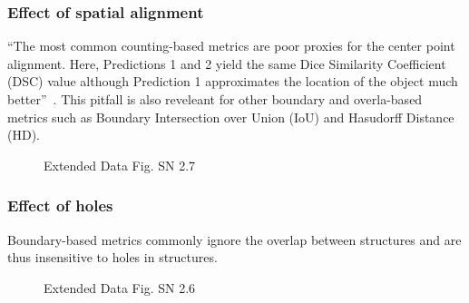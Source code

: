 \documentclass[11pt]{article}
\begin{document}
\subsubsection{Effect of spatial alignment}

``The most common counting-based metrics are poor proxies for the center point alignment. Here, Predictions 1 and 2 yield the same Dice Similarity Coefficient (DSC) value although Prediction 1 approximates the location of the object much better''~\cite{pitfalls-in-segmentation-evaluation}. This pitfall is also reveleant for other boundary and overla-based metrics such as Boundary Intersection over Union (IoU) and Hasudorff Distance (HD).

\begin{figure}[H]
    \centering
    \caption{Extended Data Fig. SN 2.7~\cite{pitfalls-in-segmentation-evaluation}}
\end{figure}

\subsubsection{Effect of holes}

Boundary-based metrics commonly ignore the overlap between structures and are thus insensitive to holes in structures.

\begin{figure}[H]
    \centering
    \caption{Extended Data Fig. SN 2.6~\cite{pitfalls-in-segmentation-evaluation}}
\end{figure}
\end{document}
